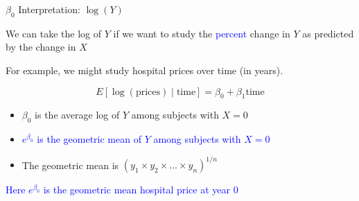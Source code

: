 \documentclass[10pt,t]{beamer}
\begin{document}
\begin{frame}{$\beta_0$ Interpretation: $\log(Y)$}
	
	\vspace{-5 mm}
	
	We can take the log of $Y$ if we want to study the \textcolor{blue}{percent} change in $Y$ as predicted by the change in $X$
	\medskip
	
	For example, we might study hospital prices over time (in years). 

	$$
	E[\log(\text{prices}) \mid \text{time}] = \beta_0 + \beta_1 \text{time}
	$$
	\medskip
	
	\begin{itemize}
		\item $\beta_0$ is the average log of $Y$ among subjects with $X=0$
		\medskip
		
		\item \textcolor{blue}{$e^{\beta_0}$ is the geometric mean of $Y$ among subjects with $X=0$}
		\medskip
		
		\item The geometric mean is $(y_1\times y_2\times ...\times y_n)^{1/n}$
		\bigskip
	\end{itemize}
	
	\textcolor{blue}{Here $e^{\beta_0}$ is the geometric mean hospital price at year 0}
	
	
	
\end{frame}
\end{document}
